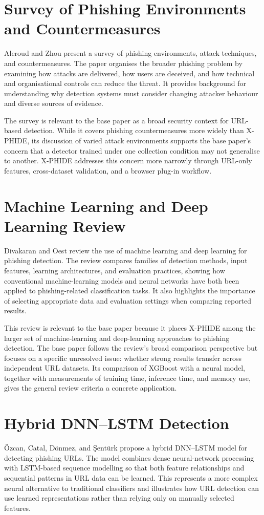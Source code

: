 \section{Survey of Phishing Environments and Countermeasures}
Aleroud and Zhou present a survey of phishing environments, attack techniques, and countermeasures. The paper organises the broader phishing problem by examining how attacks are delivered, how users are deceived, and how technical and organisational controls can reduce the threat. It provides background for understanding why detection systems must consider changing attacker behaviour and diverse sources of evidence.\cite{bib4}

The survey is relevant to the base paper as a broad security context for URL-based detection. While it covers phishing countermeasures more widely than X-PHIDE, its discussion of varied attack environments supports the base paper's concern that a detector trained under one collection condition may not generalise to another. X-PHIDE addresses this concern more narrowly through URL-only features, cross-dataset validation, and a browser plug-in workflow.\cite{bib1,bib4}

\section{Machine Learning and Deep Learning Review}
Divakaran and Oest review the use of machine learning and deep learning for phishing detection. The review compares families of detection methods, input features, learning architectures, and evaluation practices, showing how conventional machine-learning models and neural networks have both been applied to phishing-related classification tasks. It also highlights the importance of selecting appropriate data and evaluation settings when comparing reported results.\cite{bib5}

This review is relevant to the base paper because it places X-PHIDE among the larger set of machine-learning and deep-learning approaches to phishing detection. The base paper follows the review's broad comparison perspective but focuses on a specific unresolved issue: whether strong results transfer across independent URL datasets. Its comparison of XGBoost with a neural model, together with measurements of training time, inference time, and memory use, gives the general review criteria a concrete application.\cite{bib1,bib5}

\section{Hybrid DNN--LSTM Detection}
Özcan, Catal, Dönmez, and \c{S}entürk propose a hybrid DNN--LSTM model for detecting phishing URLs. The model combines dense neural-network processing with LSTM-based sequence modelling so that both feature relationships and sequential patterns in URL data can be learned. This represents a more complex neural alternative to traditional classifiers and illustrates how URL detection can use learned representations rather than relying only on manually selected features.\cite{bib6}

